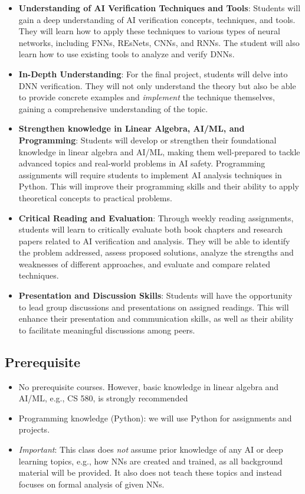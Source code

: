 \documentclass[11pt]{article}
\begin{document}
\begin{itemize}
\item \textbf{Understanding of AI Verification Techniques and Tools}: Students will gain a deep understanding of AI verification concepts, techniques, and tools. They will learn how to apply these techniques to various types of neural networks, including FNNs, REsNets, CNNs, and RNNs.  The student will also learn how to use existing tools to analyze and verify DNNs.

\item \textbf{In-Depth Understanding}: For the final project, students will delve into DNN verification. They will not only understand the theory but also be able to provide concrete examples and \emph{implement} the technique themselves, gaining a comprehensive understanding of the topic.  

\item \textbf{Strengthen knowledge in Linear Algebra, AI/ML, and Programming}: Students will develop or strengthen their foundational knowledge in linear algebra and AI/ML, making them well-prepared to tackle advanced topics and real-world problems in AI safety. 
Programming assignments will require students to implement AI analysis techniques in Python. This will improve their programming skills and their ability to apply theoretical concepts to practical problems.


\item \textbf{Critical Reading and Evaluation}: Through weekly reading assignments, students will learn to critically evaluate both book chapters and research papers related to AI verification and analysis. They will be able to identify the problem addressed, assess proposed solutions, analyze the strengths and weaknesses of different approaches, and evaluate and compare related techniques.

\item \textbf{Presentation and Discussion Skills}: Students will have the opportunity to lead group discussions and presentations on assigned readings. This will enhance their presentation and communication skills, as well as their ability to facilitate meaningful discussions among peers.

\end{itemize}



\subsection{Prerequisite}
\begin{itemize}
\item No prerequisite courses. However, basic knowledge in linear algebra and AI/ML, e.g., CS 580, is strongly recommended
\item Programming knowledge (Python): we will use Python for assignments and projects.
\item \emph{Important}: This class does \emph{not} assume prior knowledge of any AI or deep learning topics, e.g., how NNs are created and trained, as all background material will be provided. It also does not teach these topics and instead focuses on formal analysis of given NNs.
\end{itemize}
\end{document}
